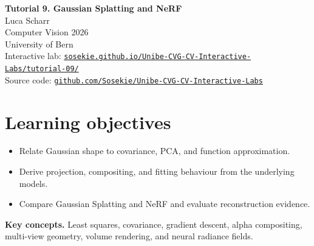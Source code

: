 \documentclass[11pt,a4paper]{article}
\begin{document}
\begin{center}
{\Large\bfseries Tutorial 9. Gaussian Splatting and NeRF}\\[2mm]
Luca Scharr\\
Computer Vision 2026\\
University of Bern\\[1mm]
Interactive lab: \href{https://sosekie.github.io/Unibe-CVG-CV-Interactive-Labs/tutorial-09/}{\nolinkurl{sosekie.github.io/Unibe-CVG-CV-Interactive-Labs/tutorial-09/}}\\
Source code: \href{https://github.com/Sosekie/Unibe-CVG-CV-Interactive-Labs}{\nolinkurl{github.com/Sosekie/Unibe-CVG-CV-Interactive-Labs}}
\end{center}

\section*{Learning objectives}
\begin{itemize}[nosep]
\item Relate Gaussian shape to covariance, PCA, and function approximation.
\item Derive projection, compositing, and fitting behaviour from the underlying models.
\item Compare Gaussian Splatting and NeRF and evaluate reconstruction evidence.
\end{itemize}
\noindent\textbf{Key concepts.} Least squares, covariance, gradient descent, alpha compositing, multi-view geometry, volume rendering, and neural radiance fields.
\end{document}
